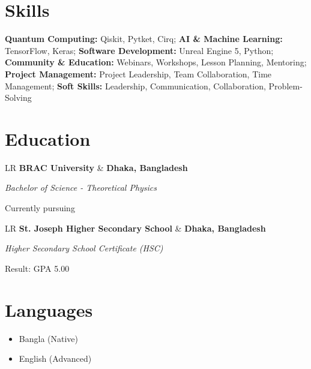 \documentclass[11pt,a3paper]{moderncv}
\newcommand*{\educationentry}[4][0.5mm]{
    \begin{tabularx}{\textwidth}{LR}
        {\bfseries #3} & {\bfseries #4} \\
    \end{tabularx}
    {\itshape #2}
    \par\addvspace{#1}
}
\begin{document}
\begin{minipage}[t]{0.35\textwidth}
{\small
\nocite{*}

}


\section{Skills}
{\small
\textbf{Quantum Computing:} Qiskit, Pytket, Cirq; \textbf{AI \& Machine Learning:} TensorFlow, Keras; \textbf{Software Development:} Unreal Engine 5, Python; \textbf{Community \& Education:} Webinars, Workshops, Lesson Planning, Mentoring; \textbf{Project Management:} Project Leadership, Team Collaboration, Time Management; \textbf{Soft Skills:} Leadership, Communication, Collaboration, Problem-Solving
}
\section{Education}
{\small
\educationentry{Bachelor of Science - Theoretical Physics}{BRAC University}{Dhaka, Bangladesh}
Currently pursuing
\par
\vspace{3.0mm}
\educationentry{Higher Secondary School Certificate (HSC)}{St. Joseph Higher Secondary School}{Dhaka, Bangladesh}
Result: GPA 5.00
}
\section{Languages}
\begin{itemize}
    \item Bangla (Native)
    \item English (Advanced)
\end{itemize}



\end{minipage}
\end{document}
